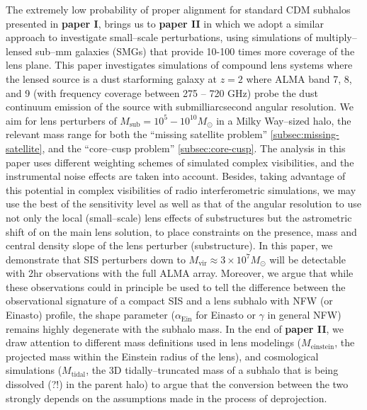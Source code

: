 \documentclass[paper=a4, fontsize=11pt]{scrartcl} %
\numberwithin{equation}{section} %
\numberwithin{figure}{section} %
\numberwithin{table}{section} %
\begin{document}
The extremely low probability of proper alignment for standard CDM subhalos presented in {\bf paper I}, brings us to {\bf paper II} in which we adopt a similar approach to investigate small--scale perturbations, using simulations of multiply--lensed sub--mm galaxies (SMGs) that provide 10-100 times more coverage of the lens plane. This paper investigates simulations of compound lens systems where the lensed source is a dust starforming galaxy at $z = 2$ where ALMA band 7, 8, and 9 (with frequency coverage between 275 -- 720 GHz) probe the dust continuum emission of the source with submilliarcsecond angular resolution.  We aim for lens perturbers of $M_\mathrm{sub} = 10^5 - 10^{10} M_\odot$ in a Milky Way--sized halo, the relevant mass range for both the ``missing satellite problem'' \ref{subsec:missing-satellite}, and the ``core--cusp problem'' \ref{subsec:core-cusp}. The analysis in this paper uses different weighting schemes of simulated complex visibilities, and the instrumental noise effects are taken into account. Besides, taking advantage of this potential in complex visibilities of radio interferometric simulations, we may use the best of the sensitivity level as well as that of the angular resolution to use not only the local (small--scale) lens effects of substructures but the astrometric shift of on the main lens solution, to place constraints on the presence, mass and central density slope of the lens perturber (substructure). In this paper, we demonstrate that SIS perturbers down to $M_\mathrm{vir} \approx 3\times 10^7 M_\odot$ will be detectable with 2hr observations with the full ALMA array. Moreover, we argue that while these observations could in principle be used to tell the difference between the observational signature of a compact SIS and a lens subhalo with NFW (or Einasto) profile, the shape parameter ($\alpha_\mathrm{Ein}$ for Einasto or $\gamma$ in general NFW) remains highly degenerate with the subhalo mass. In the end of {\bf paper II}, we draw attention to different mass definitions used in lens modelings ($M_\mathrm{einstein}$, the projected mass within the Einstein radius of the lens), and cosmological simulations ($M_\mathrm{tidal}$, the 3D tidally--truncated mass of a subhalo that is being dissolved (?!) in the parent halo) to argue that the conversion between the two strongly depends on the assumptions made in the process of deprojection. 
\end{document}
